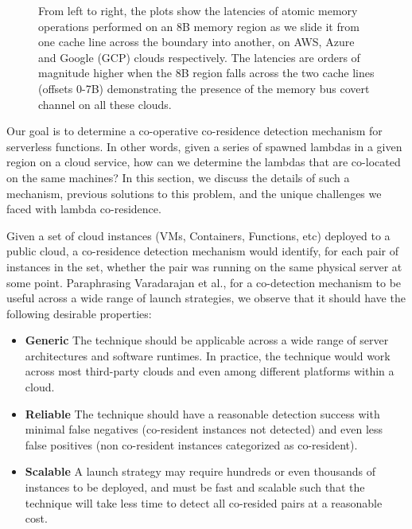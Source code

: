 \begin{figure}[h!]
\begin{subfigure}{.33\textwidth}
\end{subfigure}
\caption{From left to right, the plots show the latencies of atomic 
      memory operations performed on an 8B memory region as we slide it 
      from one cache line across the boundary into another, on AWS, Azure and 
      Google (GCP) clouds respectively. The latencies 
      are orders of magnitude higher when the 8B region falls across the 
      two cache lines (offsets 0-7B) demonstrating the presence of 
      the memory bus covert channel on all these clouds. \label{fig:membus_clouds}}
\label{fig:fig}
\end{figure}


Our goal is to determine a co-operative co-residence detection mechanism for
serverless functions. In other words, given a series of spawned lambdas in a
given region on a cloud service, how can we determine the lambdas that are
co-located on the same machines?  In this section, we discuss the details of
such a mechanism, previous solutions to this problem, and the unique challenges
we faced with lambda co-residence.

Given a set of cloud instances (VMs, Containers, Functions, etc) deployed
to a public cloud, a co-residence detection mechanism would identify, for each 
pair of instances in the set, whether the pair was running on the same physical 
server at some point. Paraphrasing Varadarajan et al.\cite{varadarajan2015}, for 
a co-detection mechanism to be useful across a wide range of 
launch strategies, we observe that it should have the following desirable 
properties:

\begin{itemize}
    \item \textbf{Generic} The technique should be applicable across a wide
    range of server architectures and software runtimes. In practice, the
    technique would work across most third-party clouds and even among different
    platforms within a cloud.
    \item \textbf{Reliable} The technique should have a reasonable detection success
    with minimal false negatives (co-resident instances not detected) and even 
    less false positives (non co-resident instances categorized as co-resident).
    \item \textbf{Scalable} A launch strategy may require hundreds or even thousands 
    of instances to be deployed, and must be fast and scalable such that the 
    technique will take less time to detect all co-resided pairs at a reasonable cost.
\end{itemize}

